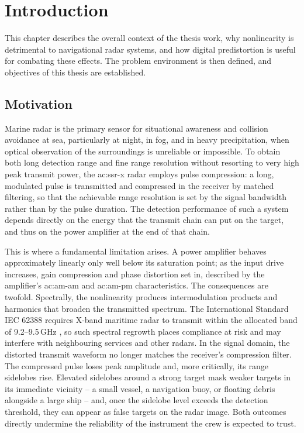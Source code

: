 %
\chapter{Introduction}\label{ch:introduction}

This chapter describes the overall context of the thesis work, why nonlinearity is detrimental to navigational radar systems, and how digital predistortion is useful for combating these effects. The problem environment is then defined, and objectives of this thesis are established. 

\section{Motivation}

Marine radar is the primary sensor for situational awareness and collision avoidance at sea, particularly at night, in fog, and in heavy precipitation, when optical observation of the surroundings is unreliable or impossible. To obtain both long detection range and fine range resolution without resorting to very high peak transmit power, the \gls{ac:ssr-x} radar employs pulse compression: a long, modulated pulse is transmitted and compressed in the receiver by matched filtering, so that the achievable range resolution is set by the signal bandwidth rather than by the pulse duration. The detection performance of such a system depends directly on the energy that the transmit chain can put on the target, and thus on the power amplifier at the end of that chain.

This is where a fundamental limitation arises. A power amplifier behaves approximately linearly only well below its saturation point; as the input drive increases, gain compression and phase distortion set in, described by the amplifier's \gls{ac:am-am} and \gls{ac:am-pm} characteristics. The consequences are twofold. Spectrally, the nonlinearity produces intermodulation products and harmonics that broaden the transmitted spectrum. The International Standard IEC 62388 requires X-band maritime radar to transmit within the allocated band of 9.2--9.5\,GHz \cite[Sec.~6.2.1.1]{iec}, so such spectral regrowth places compliance at risk and may interfere with neighbouring services and other radars. In the signal domain, the distorted transmit waveform no longer matches the receiver's compression filter. The compressed pulse loses peak amplitude and, more critically, its range sidelobes rise. Elevated sidelobes around a strong target mask weaker targets in its immediate vicinity -- a small vessel, a navigation buoy, or floating debris alongside a large ship -- and, once the sidelobe level exceeds the detection threshold, they can appear as false targets on the radar image. Both outcomes directly undermine the reliability of the instrument the crew is expected to trust.

